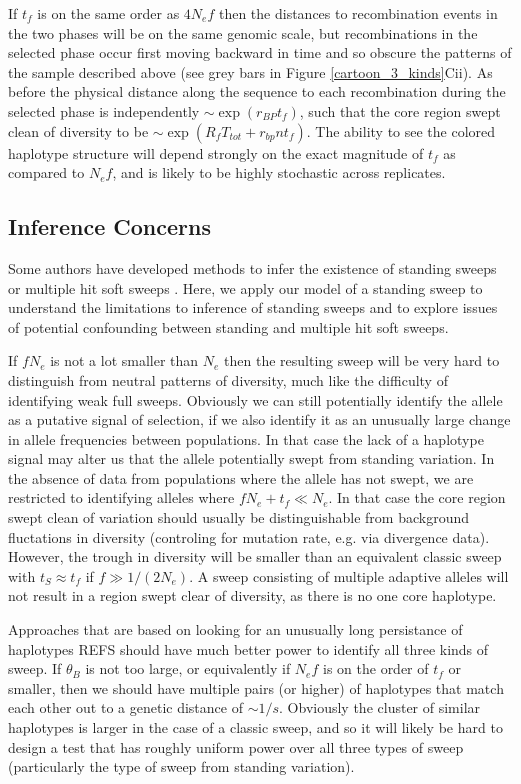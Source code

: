 \documentclass[a4paper,10pt]{article}
\begin{document}
If $t_f$ is on the same order as $4N_e f$ then the distances to recombination events in the two phases will be on the same genomic scale, but recombinations in the selected phase occur first moving backward in time and so obscure the patterns of the sample described above (see grey bars in Figure \ref{cartoon_3_kinds}Cii). As before the physical distance along the sequence to each recombination during the selected phase is independently $\sim \exp(r_{BP} t_f) $, such that the core region swept clean of diversity to be  $\sim \exp \left( R_f T_{tot} + r_{bp} n t_{f} \right)$. The ability to see the colored haplotype structure will depend strongly on the exact magnitude of $t_f$ as compared to $N_e f$, and is likely to be highly stochastic across replicates.


\subsection{Inference Concerns}

Some authors have developed methods to infer the existence of standing sweeps \citep{Peter:2012hta} or multiple hit soft sweeps \citep{Garud:2013ve}. Here, we apply our model of a standing sweep to understand the limitations to inference of standing sweeps and to explore issues of potential confounding between standing and multiple hit soft sweeps.

If $f N_e$ is not a lot smaller than $N_e$ then the resulting sweep will be very hard to distinguish from neutral patterns of diversity, much like the difficulty of identifying weak full sweeps. Obviously we can still potentially identify the allele as a putative signal of selection, if we also identify it as an unusually large change in allele frequencies between populations. In that case the lack of a haplotype signal may alter us that the allele potentially swept from standing variation. In the absence of data from populations where the allele has not swept, we are restricted to identifying alleles where $f N_e + t_f \ll N_e$. In that case the core region swept clean of variation should usually be distinguishable from background fluctations in diversity (controling for mutation rate, e.g. via divergence data). However, the trough in diversity will be smaller than an equivalent classic sweep with $t_S \approx t_f$ if $f \gg 1/(2N_e)$. A sweep consisting of multiple adaptive alleles will not result in a region swept clear of diversity, as there is no one core haplotype.

Approaches that are based on looking for an unusually long persistance of haplotypes REFS should have much better power to identify all three kinds of sweep. If $\theta_B$ is not too large, or equivalently if $N_ef$ is on the order of $t_f$ or smaller, then we should have multiple pairs (or higher) of haplotypes that match each other out to a genetic distance of $\sim 1/s$. Obviously the cluster of similar haplotypes is larger in the case of a classic sweep, and so it will likely be hard to design a test that has roughly uniform power over all three types of sweep (particularly the type of sweep from standing variation).
\end{document}
